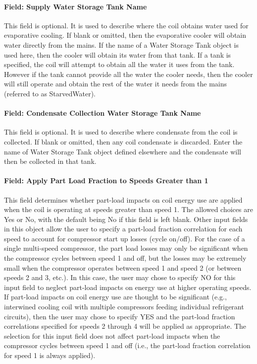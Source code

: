 \paragraph{Field: Supply Water Storage Tank Name}\label{field-supply-water-storage-tank-name-3-000}

This field is optional. It is used to describe where the coil obtains water used for evaporative cooling. If blank or omitted, then the evaporative cooler will obtain water directly from the mains. If the name of a Water Storage Tank object is used here, then the cooler will obtain its water from that tank. If a tank is specified, the coil will attempt to obtain all the water it uses from the tank. However if the tank cannot provide all the water the cooler needs, then the cooler will still operate and obtain the rest of the water it needs from the mains (referred to as StarvedWater).

\paragraph{Field: Condensate Collection Water Storage Tank Name}\label{field-condensate-collection-water-storage-tank-name-5}

This field is optional. It is used to describe where condensate from the coil is collected. If blank or omitted, then any coil condensate is discarded. Enter the name of Water Storage Tank object defined elsewhere and the condensate will then be collected in that tank.

\paragraph{Field: Apply Part Load Fraction to Speeds Greater than 1}\label{field-apply-part-load-fraction-to-speeds-greater-than-1}

This field determines whether part-load impacts on coil energy use are applied when the coil is operating at speeds greater than speed 1. The allowed choices are Yes or No, with the default being No if this field is left blank. Other input fields in this object allow the user to specify a part-load fraction correlation for each speed to account for compressor start up losses (cycle on/off). For the case of a single multi-speed compressor, the part load losses may only be significant when the compressor cycles between speed 1 and off, but the losses may be extremely small when the compressor operates between speed 1 and speed 2 (or between speeds 2 and 3, etc.). In this case, the user may chose to specify NO for this input field to neglect part-load impacts on energy use at higher operating speeds. If part-load impacts on coil energy use are thought to be significant (e.g., interwined cooling coil with multiple compressors feeding individual refrigerant circuits), then the user may chose to specify YES and the part-load fraction correlations specified for speeds 2 through 4 will be applied as appropriate. The selection for this input field does not affect part-load impacts when the compressor cycles between speed 1 and off (i.e., the part-load fraction correlation for speed 1 is always applied).

